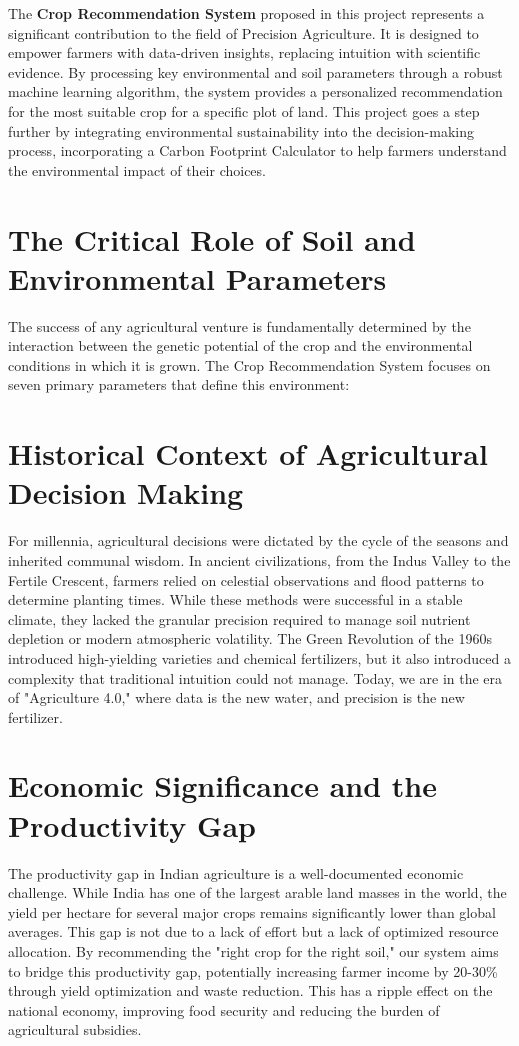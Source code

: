 \documentclass[12pt,a4paper]{report}
\begin{document}
The \textbf{Crop Recommendation System} proposed in this project represents a significant contribution to the field of Precision Agriculture. It is designed to empower farmers with data-driven insights, replacing intuition with scientific evidence. By processing key environmental and soil parameters through a robust machine learning algorithm, the system provides a personalized recommendation for the most suitable crop for a specific plot of land. This project goes a step further by integrating environmental sustainability into the decision-making process, incorporating a Carbon Footprint Calculator to help farmers understand the environmental impact of their choices.

\section{The Critical Role of Soil and Environmental Parameters}
The success of any agricultural venture is fundamentally determined by the interaction between the genetic potential of the crop and the environmental conditions in which it is grown. The Crop Recommendation System focuses on seven primary parameters that define this environment:

\section{Historical Context of Agricultural Decision Making}
For millennia, agricultural decisions were dictated by the cycle of the seasons and inherited communal wisdom. In ancient civilizations, from the Indus Valley to the Fertile Crescent, farmers relied on celestial observations and flood patterns to determine planting times. While these methods were successful in a stable climate, they lacked the granular precision required to manage soil nutrient depletion or modern atmospheric volatility. The Green Revolution of the 1960s introduced high-yielding varieties and chemical fertilizers, but it also introduced a complexity that traditional intuition could not manage. Today, we are in the era of "Agriculture 4.0," where data is the new water, and precision is the new fertilizer.

\section{Economic Significance and the Productivity Gap}
The productivity gap in Indian agriculture is a well-documented economic challenge. While India has one of the largest arable land masses in the world, the yield per hectare for several major crops remains significantly lower than global averages. This gap is not due to a lack of effort but a lack of optimized resource allocation. By recommending the "right crop for the right soil," our system aims to bridge this productivity gap, potentially increasing farmer income by 20-30\% through yield optimization and waste reduction. This has a ripple effect on the national economy, improving food security and reducing the burden of agricultural subsidies.
\end{document}
